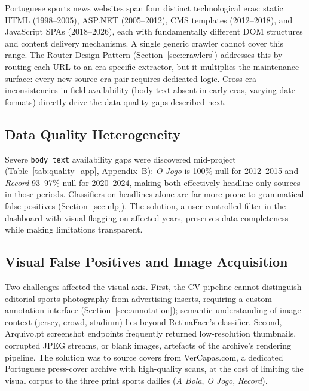 \documentclass[11pt,a4paper]{article}
\begin{document}
Portuguese sports news websites span four distinct technological eras: static HTML (1998--2005), ASP.NET (2005--2012), CMS templates (2012--2018), and JavaScript SPAs (2018--2026), each with fundamentally different DOM structures and content delivery mechanisms. A single generic crawler cannot cover this range. The Router Design Pattern (Section~\ref{sec:crawlers}) addresses this by routing each URL to an era-specific extractor, but it multiplies the maintenance surface: every new source-era pair requires dedicated logic. Cross-era inconsistencies in field availability (body text absent in early eras, varying date formats) directly drive the data quality gaps described next.

\subsection{Data Quality Heterogeneity}

Severe \texttt{body\_text} availability gaps were discovered mid-project (Table~\ref{tab:quality_app}, \hyperref[app:quality]{Appendix~B}): \textit{O Jogo} is 100\% null for 2012--2015 and \textit{Record} 93--97\% null for 2020--2024, making both effectively headline-only sources in those periods. Classifiers on headlines alone are far more prone to grammatical false positives (Section~\ref{sec:nlp}). The solution, a user-controlled filter in the dashboard with visual flagging on affected years, preserves data completeness while making limitations transparent.

\subsection{Visual False Positives and Image Acquisition}

Two challenges affected the visual axis. First, the CV pipeline cannot distinguish editorial sports photography from advertising inserts, requiring a custom annotation interface (Section~\ref{sec:annotation}); semantic understanding of image context (jersey, crowd, stadium) lies beyond RetinaFace's classifier. Second, Arquivo.pt screenshot endpoints frequently returned low-resolution thumbnails, corrupted JPEG streams, or blank images, artefacts of the archive's rendering pipeline. The solution was to source covers from VerCapas.com, a dedicated Portuguese press-cover archive with high-quality scans, at the cost of limiting the visual corpus to the three print sports dailies (\textit{A Bola}, \textit{O Jogo}, \textit{Record}).
\end{document}

